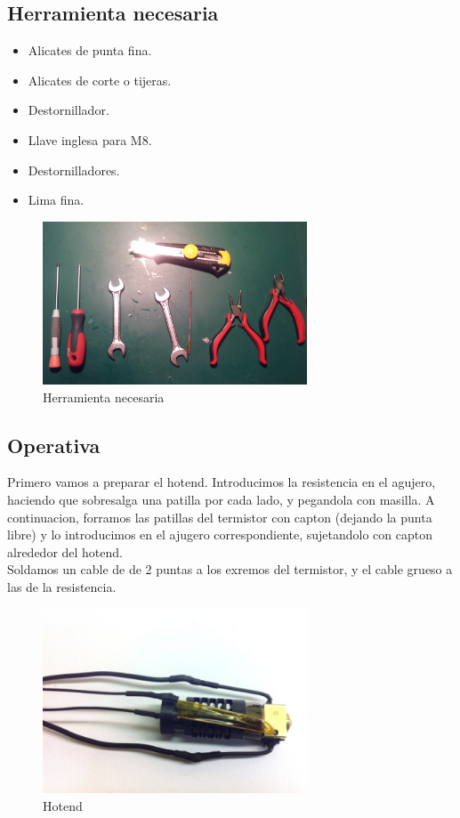 	\subsection{Herramienta necesaria}
		\begin{itemize}
			\item Alicates de punta fina.
			\item Alicates de corte o tijeras.
			\item Destornillador.
			\item Llave inglesa para M8.
			\item Destornilladores.
			\item Lima fina.
		\end{itemize}
		\begin{figure}[!htp]
			\centering
			\includegraphics[width=0.7\textwidth]{../../Fotos/96.jpg}
			\caption{Herramienta necesaria}
		\end{figure}
		
		\newpage{}
			\subsection{Operativa}
			Primero vamos a preparar el hotend. Introducimos la resistencia en el agujero, haciendo que sobresalga una patilla por cada lado, y pegandola con masilla. A continuacion, forramos las patillas del termistor con capton (dejando la punta libre) y lo
			introducimos en el ajugero correspondiente, sujetandolo con capton alrededor del hotend.\\
			Soldamos un cable de de 2 puntas a los exremos del termistor, y el cable grueso a las de la resistencia.\\
			
			\begin{figure}[!htp]
				\centering
				\includegraphics[width=0.7\textwidth]{../../Fotos/97.jpg}
				\caption{Hotend}
			\end{figure}
			

